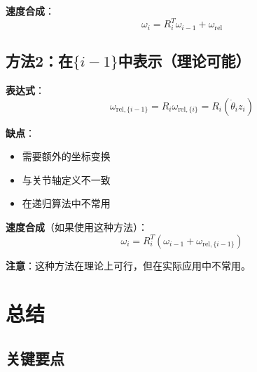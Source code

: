 \documentclass[12pt,a4paper]{article}
\begin{document}
\textbf{速度合成}：
\begin{equation}
\omega_i = R_i^T \omega_{i-1} + \omega_{\text{rel}}
\end{equation}

\subsection{方法2：在$\{i-1\}$中表示（理论可能）}

\textbf{表达式}：
\begin{equation}
\omega_{\text{rel},\{i-1\}} = R_i \omega_{\text{rel},\{i\}} = R_i (\dot{\theta}_i z_i)
\end{equation}

\textbf{缺点}：
\begin{itemize}
\item 需要额外的坐标变换
\item 与关节轴定义不一致
\item 在递归算法中不常用
\end{itemize}

\textbf{速度合成}（如果使用这种方法）：
\begin{equation}
\omega_i = R_i^T (\omega_{i-1} + \omega_{\text{rel},\{i-1\}})
\end{equation}

\textbf{注意}：这种方法在理论上可行，但在实际应用中不常用。

\section{总结}

\subsection{关键要点}
\end{document}
